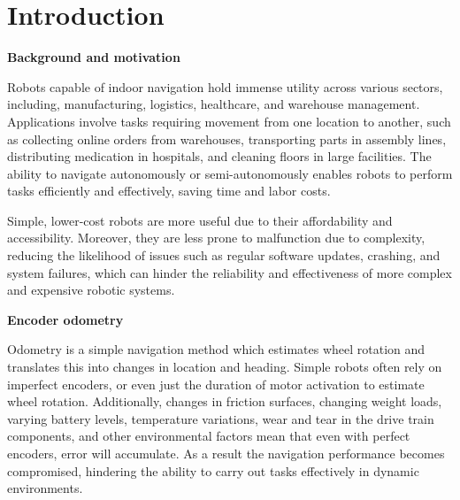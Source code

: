 
\section{Introduction}
\textbf{Background and motivation}  

Robots capable of indoor navigation hold immense utility across various sectors, including, manufacturing, logistics, healthcare, and warehouse management.
Applications involve tasks requiring movement from one location to another, such as collecting online orders from warehouses, transporting parts in assembly lines, distributing medication in hospitals, and cleaning floors in large facilities. 
The ability to navigate autonomously or semi-autonomously enables robots to perform tasks efficiently and effectively, saving time and labor costs.

Simple, lower-cost robots are more useful due to their affordability and accessibility. 
Moreover, they are less prone to malfunction due to complexity, reducing the likelihood of issues such as regular software updates, crashing, and system failures, which can hinder the reliability and effectiveness of more complex and expensive robotic systems. 

\textbf{Encoder odometry}

Odometry is a simple navigation method which estimates wheel rotation and translates this into changes in location and heading. 
Simple robots often rely on imperfect encoders, or even just the duration of motor activation to estimate wheel rotation. Additionally, changes in friction surfaces, changing weight loads, varying battery levels, temperature variations, wear and tear in the drive train components, and other environmental factors mean that even with perfect encoders, error will accumulate. 
As a result the navigation performance becomes compromised, hindering the ability to carry out tasks effectively in dynamic environments.

